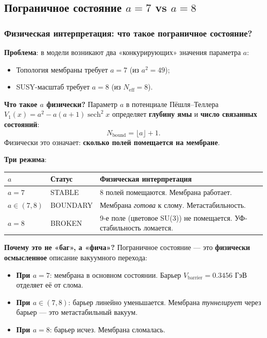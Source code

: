 \documentclass[11pt,a4paper]{article}
\theoremstyle{definition}
\begin{document}
\subsection{Пограничное состояние \texorpdfstring{$a = 7$}{a = 7} vs \texorpdfstring{$a = 8$}{a = 8}}
\label{subsec:membrane-boundary}
\subsubsection{Физическая интерпретация: что такое пограничное состояние?}
\label{subsubsec:boundary-interpretation}

\textbf{Проблема}: в модели возникают два «конкурирующих» 
значения параметра $a$:
\begin{itemize}
    \item Топология мембраны требует $a = 7$ (из $a^2 = 49$);
    \item SUSY-масштаб требует $a = 8$ (из $N_{\text{eff}} = 8$).
\end{itemize}

\medskip\noindent
\textbf{Что такое $a$ физически?}
Параметр $a$ в потенциале Пёшля–Теллера 
$V_1(x) = a^2 - a(a+1)\operatorname{sech}^2 x$ 
определяет \textbf{глубину ямы} и \textbf{число связанных состояний}:
\begin{equation}
    N_{\text{bound}} = \lfloor a \rfloor + 1.
\end{equation}
Физически это означает: \textbf{сколько полей помещается на мембране}.

\medskip\noindent
\textbf{Три режима}:
\begin{center}
\begin{tabular}{p{2cm}p{3cm}p{5cm}}
\toprule
$a$ & Статус & Физическая интерпретация \\
\midrule
$a = 7$ & STABLE & 8 полей помещаются. Мембрана работает. \\
$a \in (7, 8)$ & BOUNDARY & Мембрана \emph{готова} к слому. Метастабильность. \\
$a = 8$ & BROKEN & 9-е поле (цветовое SU(3)) не помещается. УФ-стабильность ломается. \\
\bottomrule
\end{tabular}
\end{center}

\medskip\noindent
\textbf{Почему это не «баг», а «фича»?}
Пограничное состояние — это \textbf{физически осмысленное} 
описание вакуумного перехода:
\begin{itemize}
    \item \textbf{При $a = 7$}: мембрана в основном состоянии. 
          Барьер $V_{\text{barrier}} = 0.3456$ ГэВ отделяет 
          её от слома.
    \item \textbf{При $a \in (7, 8)$}: барьер линейно уменьшается. 
          Мембрана \emph{туннелирует} через барьер — это 
          метастабильный вакуум.
    \item \textbf{При $a = 8$}: барьер исчез. Мембрана сломалась.
\end{itemize}
\end{document}

